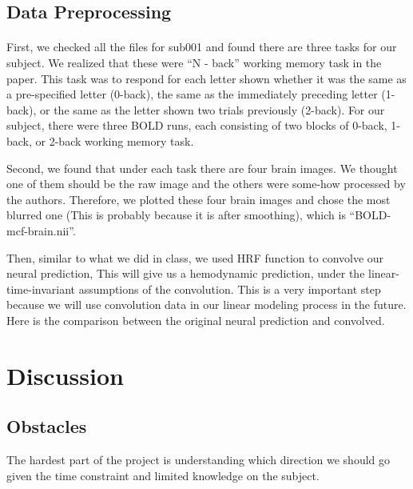 \documentclass[11pt]{article}
\begin{document}
\subsection{Data Preprocessing}
\paragraph{}
First, we checked all the files for sub001 and found there are three tasks for
our subject. We realized that these were ``N - back'' working memory task in
the paper. This task was to respond for each letter shown whether it was the
same as a pre-specified letter (0-back), the same as the immediately preceding
letter (1-back), or the same as the letter shown two trials previously
(2-back). For our subject, there were three BOLD runs, each consisting of two
blocks of 0-back, 1-back, or 2-back working memory task. 

Second, we found that under each task there are four brain images. We thought
one of them should be the raw image and the others were some-how processed by
the authors. Therefore, we plotted these four brain images and chose the most
blurred one (This is probably because it is after smoothing), which is
``BOLD-mcf-brain.nii''. 

Then, similar to what we did in class, we used HRF function to convolve our
neural prediction, This will give us a hemodynamic prediction, under the
linear-time-invariant assumptions of the convolution. This is a very important
step because we will use convolution data in our linear modeling process in the
future. Here is the comparison between the original neural prediction and
convolved.

\section{Discussion}
\subsection{Obstacles} 

The hardest part of the project is understanding which direction we should go
given the time constraint and limited knowledge on the subject. 


\end{document}
